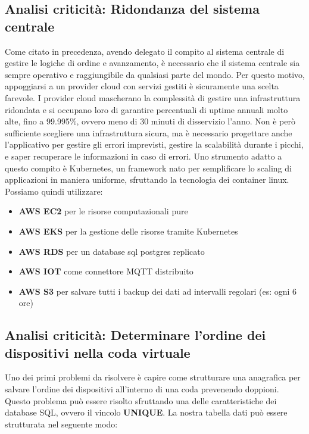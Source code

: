 \documentclass[a4paper, titlepage, 12pt, openright, twoside]{book}
\begin{document}
\subsection{Analisi criticità: Ridondanza del sistema centrale}

Come citato in precedenza, avendo delegato il compito al sistema centrale di gestire le logiche di ordine e avanzamento, è necessario che il sistema centrale sia sempre operativo
e raggiungibile da qualsiasi parte del mondo. Per questo motivo, appoggiarsi a un provider cloud con servizi gestiti è sicuramente una scelta farevole. I provider cloud mascherano
la complessità di gestire una infrastruttura ridondata e si occupano loro di garantire percentuali di uptime annuali molto alte, fino a 99.995\%, ovvero meno di 30 minuti di disservizio l'anno. Non è però sufficiente scegliere una infrastruttura sicura, ma è necessario progettare anche l'applicativo per gestire gli errori imprevisti, gestire la scalabilità durante i picchi, e saper recuperare le informazioni in caso di errori. Uno strumento adatto a questo compito è Kubernetes, un framework nato per semplificare lo scaling di applicazioni in maniera uniforme, sfruttando la tecnologia dei container linux. Possiamo quindi utilizzare:
\begin{itemize}
	\item \textbf{AWS EC2} per le risorse computazionali pure
	\item \textbf{AWS EKS} per la gestione delle risorse tramite Kubernetes
	\item \textbf{AWS RDS} per un database sql postgres replicato
	\item \textbf{AWS IOT} come connettore MQTT distribuito
	\item \textbf{AWS S3} per salvare tutti i backup dei dati ad intervalli regolari (es: ogni 6 ore)
\end{itemize}

\subsection{Analisi criticità: Determinare l'ordine dei dispositivi nella coda virtuale}

Uno dei primi problemi da risolvere è capire come strutturare una anagrafica per salvare l'ordine dei dispositivi all'interno di una coda prevenendo doppioni.
Questo problema può essere risolto sfruttando una delle caratteristiche dei database SQL, ovvero il vincolo \textbf{UNIQUE}.
La nostra tabella dati può essere strutturata nel seguente modo:
\end{document}
